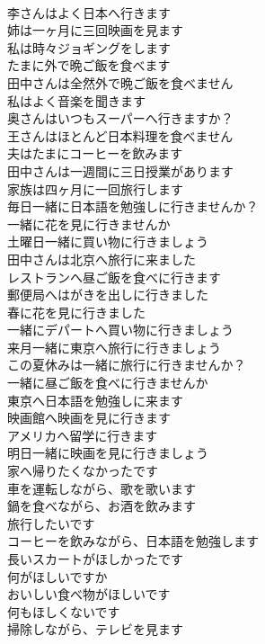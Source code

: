 \documentclass[8pt]{extreport}
\begin{document}
\begin{CJK}{UTF8}{min}
\\	李さんはよく日本へ行きます	
\\	姉は一ヶ月に三回映画を見ます	
\\	私は時々ジョギングをします	
\\	たまに外で晩ご飯を食べます	
\\	田中さんは全然外で晩ご飯を食べません	
\\	私はよく音楽を聞きます	
\\	奥さんはいつもスーパーへ行きますか？	
\\	王さんはほとんど日本料理を食べません	
\\	夫はたまにコーヒーを飲みます	
\\	田中さんは一週間に三日授業があります	
\\	家族は四ヶ月に一回旅行します	
\\	毎日一緒に日本語を勉強しに行きませんか？	
\\	一緒に花を見に行きませんか	
\\	土曜日一緒に買い物に行きましょう	
\\	田中さんは北京へ旅行に来ました	
\\	レストランへ昼ご飯を食べに行きます	
\\	郵便局へはがきを出しに行きました	
\\	春に花を見に行きました	
\\	一緒にデパートへ買い物に行きましょう	
\\	来月一緒に東京へ旅行に行きましょう	
\\	この夏休みは一緒に旅行に行きませんか？	
\\	一緒に昼ご飯を食べに行きませんか	
\\	東京へ日本語を勉強しに来ます	
\\	映画館へ映画を見に行きます	
\\	アメリカへ留学に行きます	
\\	明日一緒に映画を見に行きましょう	
\\	家へ帰りたくなかったです	
\\	車を運転しながら、歌を歌います	
\\	鍋を食べながら、お酒を飲みます	
\\	旅行したいです	
\\	コーヒーを飲みながら、日本語を勉強します	
\\	長いスカートがほしかったです	
\\	何がほしいですか	
\\	おいしい食べ物がほしいです	
\\	何もほしくないです	
\\	掃除しながら、テレビを見ます	

\end{CJK}
\end{document}

